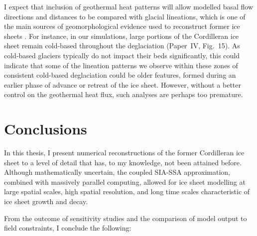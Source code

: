 \documentclass[a4paper]{kappa}
\newcommand{\CCYC}[0]{Paper~IV}     %
\begin{document}
I expect that inclusion of geothermal heat patterns will allow modelled basal
flow directions and distances to be compared with glacial lineations, which is
one of the main sources of geomorphological evidence used to reconstruct former
ice sheets \citep{Boulton.Clark.1990, Kleman.etal.1997, Kleman.etal.2010}. For
instance, in our simulations, large portions of the Cordilleran ice sheet
remain cold-based throughout the deglaciation (\CCYC, Fig.~15). As cold-based
glaciers typically do not impact their beds significantly, this could indicate
that some of the lineation patterns we observe within these zones of consistent
cold-based deglaciation could be older features, formed during an earlier phase
of advance or retreat of the ice sheet. However, without a better control on
the geothermal heat flux, such analyses are perhaps too premature.


\section{Conclusions}

In this thesis, I present numerical reconstructions of the former Cordilleran
ice sheet to a level of detail that has, to my knowledge, not been attained
before. Although mathematically uncertain, the coupled SIA-SSA approximation,
combined with massively parallel computing, allowed for ice sheet modelling at
large spatial scales, high spatial resolution, and long time scales
characteristic of ice sheet growth and decay.

From the outcome of sensitivity studies and the comparison of model output to
field constraints, I conclude the following:
\end{document}
